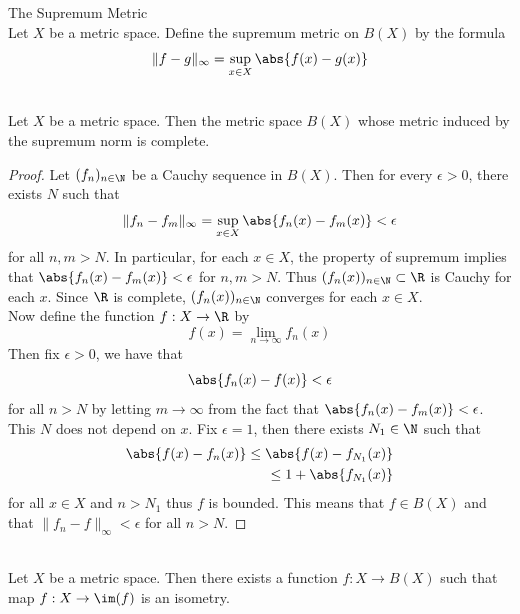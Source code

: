 \documentclass[a4paper]{article}
\begin{document}
\begin{defn}{The Supremum Metric}{}\\
Let $X$ be a metric space. Define the supremum metric on $B(X)$ by the formula $$\|f-g\|_\infty=\sup_{x\in X}\abs{f(x)-g(x)}$$
\end{defn}

\begin{prp}{}{}\\
Let $X$ be a metric space. Then the metric space $B(X)$ whose metric induced by the supremum norm is complete. 
\begin{proof}
Let $(f_n)_{n\in\N}$ be a Cauchy sequence in $B(X)$. Then for every $\epsilon>0$, there exists $N$ such that $$\|f_n-f_m\|_{\infty}=\sup_{x\in X}\abs{f_n(x)-f_m(x)}<\epsilon$$ for all $n,m>N$. In particular, for each $x\in X$, the property of supremum implies that $\abs{f_n(x)-f_m(x)}<\epsilon$ for $n,m>N$. Thus $(f_n(x))_{n\in\N}\subset\R$ is Cauchy for each $x$. Since $\R$ is complete, $(f_n(x))_{n\in\N}$ converges for each $x\in X$. \\
Now define the function $f:X\to\R$ by $$f(x)=\lim_{n\to\infty}f_n(x)$$ Then fix $\epsilon>0$, we have that $$\abs{f_n(x)-f(x)}<\epsilon$$ for all $n>N$ by letting $m\to\infty$ from the fact that $\abs{f_n(x)-f_m(x)}<\epsilon$. This $N$ does not depend on $x$. Fix $\epsilon=1$, then there exists $N_1\in\N$ such that 
\begin{align*}
\abs{f(x)-f_n(x)}\leq\abs{f(x)-f_{N_1}(x)}\\
\leq 1+\abs{f_{N_1}(x)}
\end{align*} for all $x\in X$ and $n>N_1$ thus $f$ is bounded. This means that $f\in B(X)$ and that $\|f_n-f\|_\infty<\epsilon$ for all $n>N$. 
\end{proof}
\end{prp}

\begin{prp}{}{}\\
Let $X$ be a metric space. Then there exists a function $f:X\to B(X)$ such that map $f:X\to\im(f)$ is an isometry. 
\end{prp}
\end{document}
